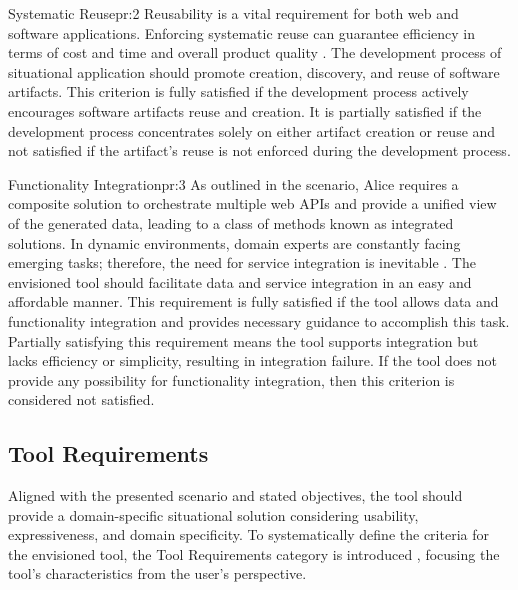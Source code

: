 \begin{thesisdprequirement}{Systematic Reuse}{pr:2}
Reusability is a vital requirement for both web and software applications. Enforcing systematic reuse can guarantee efficiency in terms of cost and time and overall product quality \autocite{Schmidt1999a}. The development process of situational application should promote creation, discovery, and reuse of software artifacts. 
This criterion is fully satisfied if the development process actively encourages software artifacts reuse and creation. It is partially satisfied if the development process concentrates solely on either artifact creation or reuse and not satisfied if the artifact's reuse is not enforced during the development process.

\end{thesisdprequirement}

\begin{thesisdprequirement}{Functionality Integration}{pr:3}
As outlined in the scenario, Alice requires a composite solution to orchestrate multiple web APIs and provide a unified view of the generated data, leading to a class of methods known as integrated solutions. In dynamic environments, domain experts are constantly facing emerging tasks; therefore, the need for service integration is inevitable \autocite{Daniel2014a}. The envisioned tool should facilitate data and service integration in an easy and affordable manner. 
This requirement is fully satisfied if the tool allows data and functionality integration and provides necessary guidance to accomplish this task. Partially satisfying this requirement means the tool supports integration but lacks efficiency or simplicity, resulting in integration failure. If the tool does not provide any possibility for functionality integration, then this criterion is considered not satisfied.

\end{thesisdprequirement}


\subsection{Tool Requirements}\label{sec:tool-requirements}
\vspace{10pt}
Aligned with the presented scenario and stated objectives, the tool should provide a domain-specific situational solution considering usability, expressiveness, and domain specificity. To systematically define the criteria for the envisioned tool, the Tool Requirements category is introduced , focusing the tool’s characteristics from the user's perspective.

